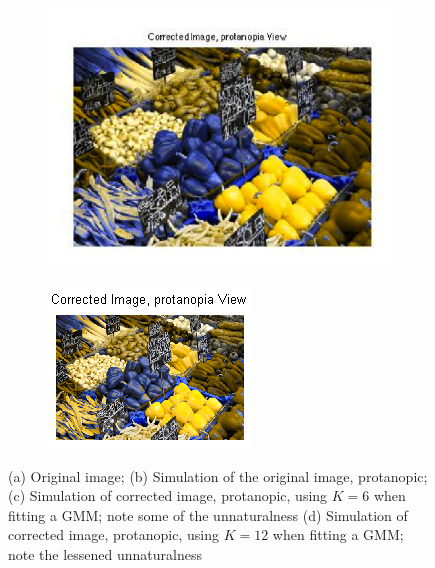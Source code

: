 \documentclass[10pt,twocolumn,letterpaper]{article}
\begin{document}
\begin{figure}[h]
\begin{subfigure}{0.23\textwidth}
    \includegraphics[width=\textwidth]{peppers.png}
    \caption{}
  \end{subfigure}
  \begin{subfigure}{0.23\textwidth}
    \includegraphics[width=\textwidth]{peppers_12.png}
    \caption{}
  \end{subfigure}
  \caption{(a) Original image; (b) Simulation of the original image, protanopic; (c) Simulation of corrected image, protanopic, using $K=6$ when fitting a GMM; note some of the unnaturalness (d) Simulation of corrected image, protanopic, using $K=12$ when fitting a GMM; note the lessened unnaturalness}
  \label{fig:peppers}
\end{figure}
\end{document}
